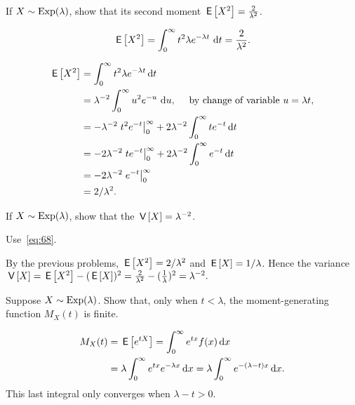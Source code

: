 \begin{extra} 
 If $X\sim\operatorname{Exp}(\lambda)$, show that its second moment $\,\mathsf{E}\left[X^2\right] = \frac{2}{\lambda^2}$.
\begin{hint}
 \begin{equation*}
 \,\mathsf{E}\left[X^2\right]= \int_0^\infty t^2 \lambda e^{-\lambda t}\, \,\text{d}t = \frac{2}{\lambda^2}.
 \end{equation*}
\end{hint}
\begin{solution}
 \begin{align*}
\,\mathsf{E}\left[X^2\right] 
&= \int_0^\infty t^2 \lambda e^{-\lambda t} \,\text{d}t \\
&= \lambda^{-2} \int_0^\infty u^2 e^{-u}\, \,\text{d}u, \quad \text{ by change of variable $u=\lambda t$}, \\
&= -\lambda^{-2}\left. t^2 e^{- t}\right|_0^\infty + 2\lambda^{-2}\int_0^\infty t e^{- t} \,\text{d}t \\
&= -2\lambda^{-2}\left. t e^{- t}\right|_0^\infty + 2\lambda^{-2} \int_0^\infty e^{- t} \,\text{d}t\\
&= - 2\lambda^{-2} \left. e^{- t} \right|_0^\infty \\
&= 2/\lambda^2.
 \end{align*}
\end{solution}
\end{extra}


\begin{extra}
 If $X\sim\operatorname{Exp}(\lambda)$, show that the 
$\,\mathsf{V}\left[X\right] = \lambda^{-2}$.
\begin{hint} Use~\cref{eq:68}. 
\end{hint}
\begin{solution}
 By the previous problems, $\,\mathsf{E}\left[X^2\right]=2/\lambda^2$ and $\,\mathsf{E}\left[X\right] = 1/\lambda$. Hence the variance $\,\mathsf{V}\left[X\right] = \,\mathsf{E}\left[X^2\right] - (\,\mathsf{E}\left[X\right])^2 = \frac{2}{\lambda^2} - (\frac{1}{\lambda})^2 = \lambda^{-2}.$
\end{solution}
\end{extra}


\begin{extra}
 Suppose $X\sim\operatorname{Exp}(\lambda)$. Show that, only when $t < \lambda$, the moment-generating function $M_X(t)$ is finite.
\begin{solution} 
  \begin{align*}
    M_X(t) &= \,\mathsf{E}\left[e^{t X}\right] = \int_0^\infty e^{t x} f(x) \,\text{d}x \\
    &= \lambda \int_0^\infty e^{t x} e^{-\lambda x} \,\text{d}x = \lambda \int_0^\infty  e^{-(\lambda -t) x} \,\text{d}x.
  \end{align*}
This last integral only converges when $\lambda -t > 0$. 
\end{solution}
\end{extra}

